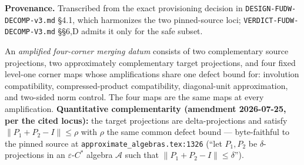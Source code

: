 \begin{defnote}
\textbf{Provenance.} Transcribed from the exact provisioning decision in
\texttt{DESIGN-\allowbreak{}FUDW-\allowbreak{}DECOMP-\allowbreak{}v3.\allowbreak{}md} \S{}4.1, which harmonizes the two pinned-source loci;
\texttt{VERDICT-\allowbreak{}FUDW-\allowbreak{}DECOMP-\allowbreak{}V3.\allowbreak{}md} \S{}\S{}6,D admits it only for the safe subset.
\end{defnote}

\hypertarget{def:four-corner-merging-datum}{}%
\begin{definition}\label{def:four-corner-merging-datum}
An \emph{amplified four-corner merging datum} consists of two
complementary source projections, two approximately complementary target
projections, and four fixed level-one corner maps whose amplifications share
one defect bound for: involution compatibility, compressed-product
compatibility, diagonal-unit approximation, and two-sided norm control. The
four maps are the same maps at every amplification. \textbf{Quantitative
complementarity (amendment 2026-07-25, per the cited locus):} the target
projections are delta-projections and satisfy \(\|P_1+P_2-I\|\le\rho\)
with \(\rho\) the same common defect bound --- byte-faithful to the pinned
source at \texttt{approximate\_algebras.\allowbreak{}tex:\allowbreak{}1326} (``let \(P_1,P_2\) be
\(\delta\)-projections in an \(\varepsilon\)-\(C^*\) algebra \(\mathcal{A}\)
such that \(\|P_1+P_2-I\|\le\delta\)'').
\end{definition}
